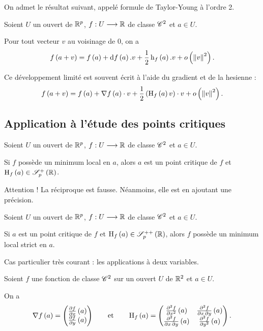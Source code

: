 On admet le résultat suivant, appelé formule de Taylor-Young à l'ordre 2.

\begin{prop}
Soient \(U\) un ouvert de \(\mathbb{R}^p\), \(f:U\longrightarrow\mathbb{R}\) de classe \(\mathscr{C}^{2}\) et \(a\in U\).

Pour tout vecteur \(v\) au voisinage de \(0\), on a \[f\paren{a+v}=f\paren{a}+\odif{f}\paren{a}.v+\dfrac{1}{2}\formehessienne{f}\paren{a}.v+\o{\norme{v}^2}.\]
\end{prop}

Ce développement limité est souvent écrit à l'aide du gradient et de la hesienne : \[f\paren{a+v}=f\paren{a}+\nabla f\paren{a}\scal v+\dfrac{1}{2}\paren{\hessienne{f}\paren{a}v}\scal v+\o{\norme{v}^2}.\]

\subsection{Application à l'étude des points critiques}

\begin{prop}
Soient \(U\) un ouvert de \(\mathbb{R}^p\), \(f:U\longrightarrow\mathbb{R}\) de classe \(\mathscr{C}^{2}\) et \(a\in U\).

Si \(f\) possède un minimum local en \(a\), alors \(a\) est un point critique de \(f\) et \(\hessienne{f}\paren{a}\in\sympos{p}[\R]\).
\end{prop}

\begin{rem}
Attention ! La réciproque est fausse. Néanmoins, elle est  en ajoutant une précision.
\end{rem}

\begin{prop}
Soient \(U\) un ouvert de \(\mathbb{R}^p\), \(f:U\longrightarrow\mathbb{R}\) de classe \(\mathscr{C}^{2}\) et \(a\in U\).

Si \(a\) est un point critique de \(f\) et \(\hessienne{f}\paren{a}\in\symdefpos{p}[\R]\), alors \(f\) possède un minimum local strict en \(a\).
\end{prop}

Cas particulier très courant : les applications à deux variables.

Soient \(f\) une fonction de classe \(\mathscr{C}^{2}\) sur un ouvert \(U\) de \(\mathbb{R}^2\) et \(a\in U\).

On a \[\nabla f\left(a\right)=\begin{pmatrix}\pdv{f}{x}\left(a\right)\\\pdv{f}{y}\left(a\right)\end{pmatrix}\qquad\text{et}\qquad\operatorname{H}_{f}\left(a\right)=\begin{pmatrix}
\pdv[order=2]{f}{x}\left(a\right) & \pdv{f}{x,y}\left(a\right) \\
\pdv{f}{x,y}\left(a\right) & \pdv[order=2]{f}{y}\left(a\right)
\end{pmatrix}.\]

